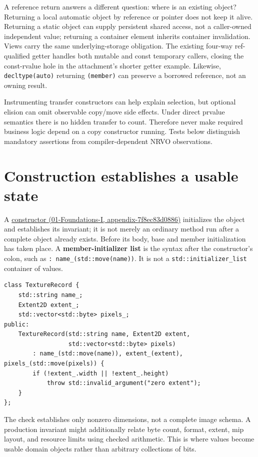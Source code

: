 A reference return answers a different question: where is an existing object? Returning a local automatic object by reference or pointer does not keep it alive. Returning a static object can supply persistent shared access, not a caller-owned independent value; returning a container element inherits container invalidation. Views carry the same underlying-storage obligation. The existing four-way ref-qualified getter handles both mutable and const temporary callers, closing the const-rvalue hole in the attachment's shorter getter example. Likewise, \texttt{decltype(auto)} returning \texttt{(member)} can preserve a borrowed reference, not an owning result.

Instrumenting transfer constructors can help explain selection, but optional elision can omit observable copy/move side effects. Under direct prvalue semantics there is no hidden transfer to count. Therefore never make required business logic depend on a copy constructor running. Tests below distinguish mandatory assertions from compiler-dependent NRVO observations.

\section{Construction establishes a usable state}\label{05-engine-i-ch003-construction-establishes-a-usable-state}

A \href{../01-Foundations-I/main.pdf\#nameddest=appendix-7f8ec83d0886}{constructor (01-Foundations-I, appendix-7f8ec83d0886)} initializes the object and establishes its invariant; it is not merely an ordinary method run after a complete object already exists. Before its body, base and member initialization has taken place. A \textbf{member-initializer list} is the syntax after the constructor's colon, such as \texttt{:\ name\_(std::move(name))}. It is not a \texttt{std::initializer\_list} container of values.

\begin{verbatim}
class TextureRecord {
    std::string name_;
    Extent2D extent_;
    std::vector<std::byte> pixels_;
public:
    TextureRecord(std::string name, Extent2D extent,
                  std::vector<std::byte> pixels)
        : name_(std::move(name)), extent_(extent), pixels_(std::move(pixels)) {
        if (!extent_.width || !extent_.height)
            throw std::invalid_argument("zero extent");
    }
};
\end{verbatim}

The check establishes only nonzero dimensions, not a complete image schema. A production invariant might additionally relate byte count, format, extent, mip layout, and resource limits using checked arithmetic. This is where values become usable domain objects rather than arbitrary collections of bits.

